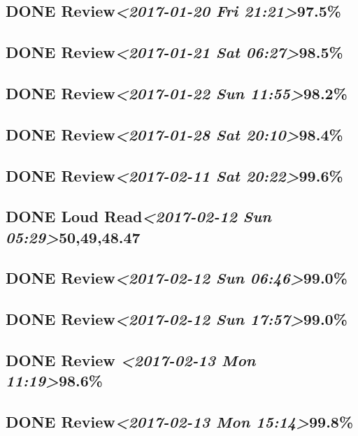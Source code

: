 \documentclass[11pt]{ctexart}
\begin{document}
\subsection{{\bfseries\sffamily DONE} Review\textit{<2017-01-20 Fri 21:21>}97.5\%}
\label{sec:org4b3372f}
\subsection{{\bfseries\sffamily DONE} Review\textit{<2017-01-21 Sat 06:27>}98.5\%}
\label{sec:org1849ef5}
\subsection{{\bfseries\sffamily DONE} Review\textit{<2017-01-22 Sun 11:55>}98.2\%}
\label{sec:orgdfded75}
\subsection{{\bfseries\sffamily DONE} Review\textit{<2017-01-28 Sat 20:10>}98.4\%}
\label{sec:org7b591df}
\subsection{{\bfseries\sffamily DONE} Review\textit{<2017-02-11 Sat 20:22>}99.6\%}
\label{sec:org3b0e168}
\subsection{{\bfseries\sffamily DONE} Loud Read\textit{<2017-02-12 Sun 05:29>}50,49,48.47}
\label{sec:orgafb653d}
\subsection{{\bfseries\sffamily DONE} Review\textit{<2017-02-12 Sun 06:46>}99.0\%}
\label{sec:org4b9f06d}
\subsection{{\bfseries\sffamily DONE} Review\textit{<2017-02-12 Sun 17:57>}99.0\%}
\label{sec:org00610c0}
\subsection{{\bfseries\sffamily DONE} Review \textit{<2017-02-13 Mon 11:19>}98.6\%}
\label{sec:orgd1d4951}
\subsection{{\bfseries\sffamily DONE} Review\textit{<2017-02-13 Mon 15:14>}99.8\%}
\label{sec:org75b336c}
\end{document}
